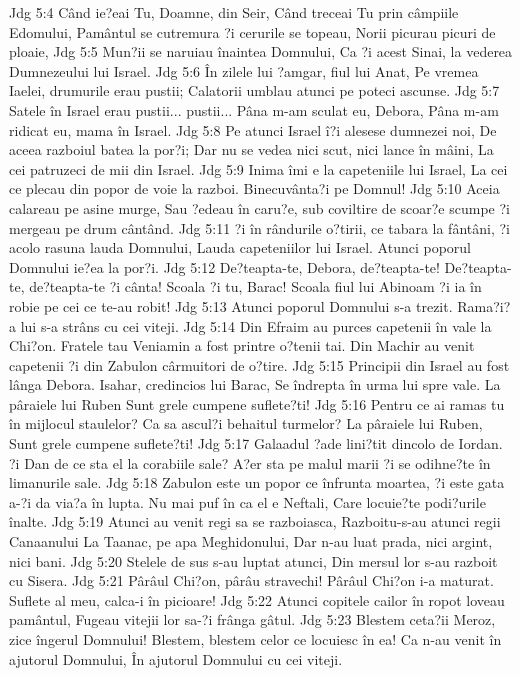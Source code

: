 Jdg 5:4  Când ie?eai Tu, Doamne, din Seir, Când treceai Tu prin câmpiile Edomului, Pamântul se cutremura ?i cerurile se topeau, Norii picurau picuri de ploaie,
Jdg 5:5  Mun?ii se naruiau înaintea Domnului, Ca ?i acest Sinai, la vederea Dumnezeului lui Israel.
Jdg 5:6  În zilele lui ?amgar, fiul lui Anat, Pe vremea Iaelei, drumurile erau pustii; Calatorii umblau atunci pe poteci ascunse.
Jdg 5:7  Satele în Israel erau pustii... pustii... Pâna m-am sculat eu, Debora, Pâna m-am ridicat eu, mama în Israel.
Jdg 5:8  Pe atunci Israel î?i alesese dumnezei noi, De aceea razboiul batea la por?i; Dar nu se vedea nici scut, nici lance în mâini, La cei patruzeci de mii din Israel.
Jdg 5:9  Inima îmi e la capeteniile lui Israel, La cei ce plecau din popor de voie la razboi. Binecuvânta?i pe Domnul!
Jdg 5:10  Aceia calareau pe asine murge, Sau ?edeau în caru?e, sub coviltire de scoar?e scumpe ?i mergeau pe drum cântând.
Jdg 5:11  ?i în rândurile o?tirii, ce tabara la fântâni, ?i acolo rasuna lauda Domnului, Lauda capeteniilor lui Israel. Atunci poporul Domnului ie?ea la por?i.
Jdg 5:12  De?teapta-te, Debora, de?teapta-te! De?teapta-te, de?teapta-te ?i cânta! Scoala ?i tu, Barac! Scoala fiul lui Abinoam ?i ia în robie pe cei ce te-au robit!
Jdg 5:13  Atunci poporul Domnului s-a trezit. Rama?i?a lui s-a strâns cu cei viteji.
Jdg 5:14  Din Efraim au purces capetenii în vale la Chi?on. Fratele tau Veniamin a fost printre o?tenii tai. Din Machir au venit capetenii ?i din Zabulon cârmuitori de o?tire.
Jdg 5:15  Principii din Israel au fost lânga Debora. Isahar, credincios lui Barac, Se îndrepta în urma lui spre vale. La pâraiele lui Ruben Sunt grele cumpene suflete?ti!
Jdg 5:16  Pentru ce ai ramas tu în mijlocul staulelor? Ca sa ascul?i behaitul turmelor? La pâraiele lui Ruben, Sunt grele cumpene suflete?ti!
Jdg 5:17  Galaadul ?ade lini?tit dincolo de Iordan. ?i Dan de ce sta el la corabiile sale? A?er sta pe malul marii ?i se odihne?te în limanurile sale.
Jdg 5:18  Zabulon este un popor ce înfrunta moartea, ?i este gata a-?i da via?a în lupta. Nu mai puf în ca el e Neftali, Care locuie?te podi?urile înalte.
Jdg 5:19  Atunci au venit regi sa se razboiasca, Razboitu-s-au atunci regii Canaanului La Taanac, pe apa Meghidonului, Dar n-au luat prada, nici argint, nici bani.
Jdg 5:20  Stelele de sus s-au luptat atunci, Din mersul lor s-au razboit cu Sisera.
Jdg 5:21  Pârâul Chi?on, pârâu stravechi! Pârâul Chi?on i-a maturat. Suflete al meu, calca-i în picioare!
Jdg 5:22  Atunci copitele cailor în ropot loveau pamântul, Fugeau vitejii lor sa-?i frânga gâtul.
Jdg 5:23  Blestem ceta?ii Meroz, zice îngerul Domnului! Blestem, blestem celor ce locuiesc în ea! Ca n-au venit în ajutorul Domnului, În ajutorul Domnului cu cei viteji.
